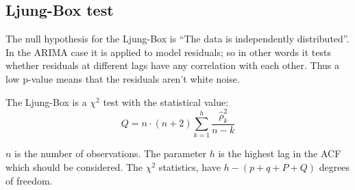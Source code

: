 \subsection{Ljung-Box test}

The null hypothesis for the Ljung-Box is ``The data is independently distributed''.
In the ARIMA case it is applied to model residuals; so in other words it tests whether residuals at different lags have any correlation with each other. 
 Thus a low p-value means that the residuals aren't white noise.

The Ljung-Box is a $\chi^2$ test with the statistical value:
\begin{equation}
Q = n \cdot (n + 2) \sum_{k=1}^h \frac{\hat{\rho}_k^2}{n - k}
\end{equation}

$n$ is the number of observations. The parameter $h$ is the highest lag in the ACF which should be considered. The $\chi^2$ statistics, have $h - (p + q + P + Q)$ degrees of freedom.
